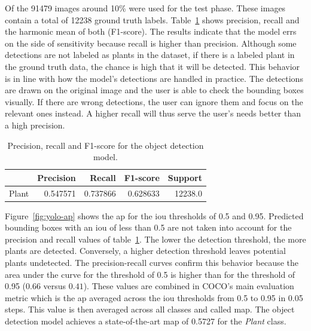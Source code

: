 \documentclass[draft,final]{vutinfth} %
\begin{document}
Of the 91479 images around 10\% were used for the test phase. These
images contain a total of 12238 ground truth
labels. Table~\ref{tab:yolo-metrics} shows precision, recall and the
harmonic mean of both (F1-score). The results indicate that the model
errs on the side of sensitivity because recall is higher than
precision. Although some detections are not labeled as plants in the
dataset, if there is a labeled plant in the ground truth data, the
chance is high that it will be detected. This behavior is in line with
how the model's detections are handled in practice. The detections are
drawn on the original image and the user is able to check the bounding
boxes visually. If there are wrong detections, the user can ignore
them and focus on the relevant ones instead. A higher recall will thus
serve the user's needs better than a high precision.

\begin{table}[h]
  \centering
  \begin{tabular}{lrrrr}
    \toprule
    {} &  Precision &    Recall &  F1-score &  Support \\
    \midrule
    Plant        &   0.547571 &  0.737866 &  0.628633 &  12238.0 \\
    \bottomrule
  \end{tabular}
  \caption{Precision, recall and F1-score for the object detection model.}
  \label{tab:yolo-metrics}
\end{table}

Figure~\ref{fig:yolo-ap} shows the \gls{ap} for the \gls{iou}
thresholds of 0.5 and 0.95. Predicted bounding boxes with an \gls{iou}
of less than 0.5 are not taken into account for the precision and
recall values of table~\ref{tab:yolo-metrics}. The lower the detection
threshold, the more plants are detected. Conversely, a higher
detection threshold leaves potential plants undetected. The
precision-recall curves confirm this behavior because the area under
the curve for the threshold of 0.5 is higher than for the threshold of
0.95 ($0.66$ versus $0.41$). These values are combined in COCO's
\cite{lin2015} main evaluation metric which is the \gls{ap} averaged
across the \gls{iou} thresholds from 0.5 to 0.95 in 0.05 steps. This
value is then averaged across all classes and called \gls{map}. The
object detection model achieves a state-of-the-art \gls{map} of 0.5727
for the \emph{Plant} class.
\end{document}
